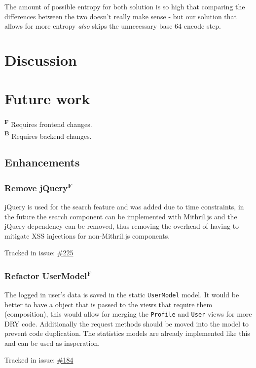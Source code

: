 \documentclass[12pt,a4paper]{report}
\begin{document}
The amount of possible entropy for both solution is so high that comparing the differences
between the two doesn't really make sense - but our solution that allows for more entropy
\textit{also} skips the unnecessary base 64 encode step.

\chapter{Discussion}
\chapter{Future work}
\label{sec:future-work}
\textbf{\textsuperscript{F}} Requires frontend changes. \\
\textbf{\textsuperscript{B}} Requires backend changes.

\section{Enhancements}
\subsection{Remove jQuery\texorpdfstring{\textsuperscript{F}}{}}
\label{subsec:remove-jquery}
jQuery is used for the search feature and was added due to time constraints, in the future the search component can be implemented with Mithril.js and the jQuery dependency can be removed, thus removing the overhead of having to mitigate XSS injections for non-Mithril.js components.

Tracked in issue: \href{https://github.com/LuleaUniversityOfTechnology/2018-project-roaster/issues/225}{\#225}

\subsection{Refactor UserModel\texorpdfstring{\textsuperscript{F}}{}}
The logged in user's data is saved in the static \texttt{UserModel} model. It would be better to have a object that is passed to the views that require them (composition), this would allow for merging the \texttt{Profile} and \texttt{User} views for more DRY code. Additionally the request methods should be moved into the model to prevent code duplication. The statistics models are already implemented like this and can be used as insperation.

Tracked in issue: \href{https://github.com/LuleaUniversityOfTechnology/2018-project-roaster/issues/184}{\#184}
\end{document}
